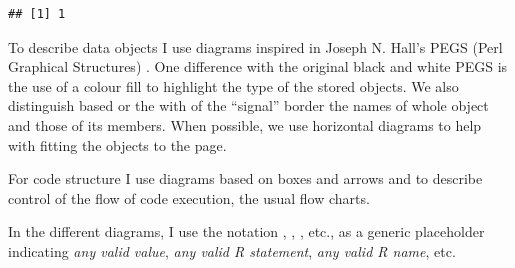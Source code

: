 \documentclass[krantz2]{krantz}\usepackage{knitr}
\begin{document}
\begin{knitrout}\footnotesize
{}\color{fgcolor}\begin{kframe}
\begin{alltt}
 \hlkwb{<-} \hlstd{(}\hlstd{,} \hlstd{,} \hlstd{)}
\end{alltt}
\begin{verbatim}
## [1] 1
\end{verbatim}
\end{kframe}
\end{knitrout}

To describe data objects I use diagrams inspired in Joseph N. Hall's PEGS (Perl Graphical Structures) \autocite{Hall1997}. One difference with the original black and white PEGS is the use of a colour fill to highlight the type of the stored objects. We also distinguish based or the with of the ``signal'' border the names of whole object and those of its members. When possible, we use horizontal diagrams to help with fitting the objects to the page.

For code structure I use diagrams based on boxes and arrows and to describe control of the flow of code execution, the usual flow charts.

In the different diagrams, I use the notation \textcolor{blue}{},  \textcolor{blue}{}, \textcolor{blue}{}, etc., as a generic placeholder indicating \emph{any valid value}, \emph{any valid R statement}, \emph{any valid R name}, etc.

\end{document}
